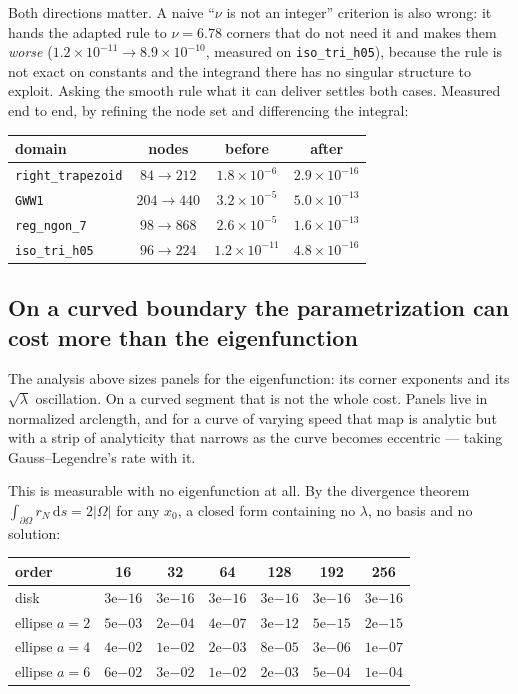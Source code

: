\documentclass[11pt]{article}
\theoremstyle{remark}
\newcommand{\dd}{\,\mathrm{d}}
\newcommand{\Om}{\Omega}
\begin{document}
Both directions matter. A naive ``$\nu$ is not an integer'' criterion is also
wrong: it hands the adapted rule to $\nu=6.78$ corners that do not need it and
makes them \emph{worse} ($1.2\times10^{-11}\to8.9\times10^{-10}$, measured on
\verb|iso_tri_h05|), because the rule is not exact on constants and the integrand
there has no singular structure to exploit. Asking the smooth rule what it can
deliver settles both cases. Measured end to end, by refining the node set and
differencing the integral:
\medskip

\begin{center}
\begin{tabular}{lccc}
\toprule
domain & nodes & before & after \\
\midrule
\verb|right_trapezoid| & $84\to212$ & $1.8\times10^{-6}$  & $2.9\times10^{-16}$\\
\verb|GWW1|            & $204\to440$& $3.2\times10^{-5}$  & $5.0\times10^{-13}$\\
\verb|reg_ngon_7|      & $98\to868$ & $2.6\times10^{-5}$  & $1.6\times10^{-13}$\\
\verb|iso_tri_h05|     & $96\to224$ & $1.2\times10^{-11}$ & $4.8\times10^{-16}$\\
\bottomrule
\end{tabular}
\end{center}

\subsection{On a curved boundary the parametrization can cost more than the eigenfunction}

The analysis above sizes panels for the eigenfunction: its corner exponents and its
$\sqrt\lambda$ oscillation. On a curved segment that is not the whole cost. Panels
live in normalized arclength, and for a curve of varying speed that map is analytic
but with a strip of analyticity that narrows as the curve becomes eccentric ---
taking Gauss--Legendre's rate with it.

This is measurable with no eigenfunction at all. By the divergence theorem
$\int_{\partial\Om} r_N\dd s = 2|\Om|$ for any $x_0$, a closed form containing no
$\lambda$, no basis and no solution:
\medskip

\begin{center}
\begin{tabular}{lcccccc}
\toprule
order & 16 & 32 & 64 & 128 & 192 & 256\\
\midrule
disk         & $3$e$-16$ & $3$e$-16$ & $3$e$-16$ & $3$e$-16$ & $3$e$-16$ & $3$e$-16$\\
ellipse $a=2$& $5$e$-03$ & $2$e$-04$ & $4$e$-07$ & $3$e$-12$ & $5$e$-15$ & $2$e$-15$\\
ellipse $a=4$& $4$e$-02$ & $1$e$-02$ & $2$e$-03$ & $8$e$-05$ & $3$e$-06$ & $1$e$-07$\\
ellipse $a=6$& $6$e$-02$ & $3$e$-02$ & $1$e$-02$ & $2$e$-03$ & $5$e$-04$ & $1$e$-04$\\
\bottomrule
\end{tabular}
\end{center}
\medskip
\end{document}
